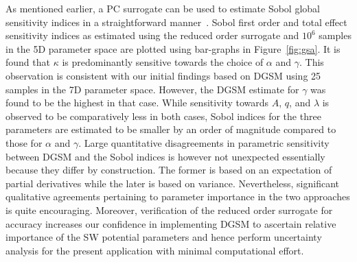 As mentioned earlier, a PC surrogate can be used to estimate Sobol global sensitivity indices in a 
straightforward manner~\cite{Sudret:2008}. Sobol first order and total effect sensitivity indices as estimated
using the reduced order surrogate and $10^{6}$ samples in the 5D parameter space are plotted using bar-graphs in
Figure~\ref{fig:gsa}. It is found that $\kappa$ is predominantly sensitive towards the choice of $\alpha$ and
$\gamma$. This observation is consistent with our initial findings based on DGSM using 25 samples in the 7D
parameter space. However, the DGSM estimate for $\gamma$ was found to be the highest in that case. 
While sensitivity towards $A$, $q$, and $\lambda$ is observed to be comparatively less in both cases, Sobol
indices for the three parameters are estimated to be smaller by an order of magnitude compared to those
for $\alpha$ and $\gamma$. Large quantitative disagreements in parametric sensitivity between DGSM and the 
Sobol indices is however not unexpected essentially because they differ by construction. The former is based
on an expectation of partial derivatives while the later is based on variance. Nevertheless, significant qualitative
agreements pertaining to parameter importance in the two approaches is quite encouraging. 
Moreover, verification of the reduced order
surrogate for accuracy increases our confidence in implementing DGSM to ascertain relative importance of the
SW potential parameters and hence perform uncertainty analysis for the present application with minimal
computational effort. 


























